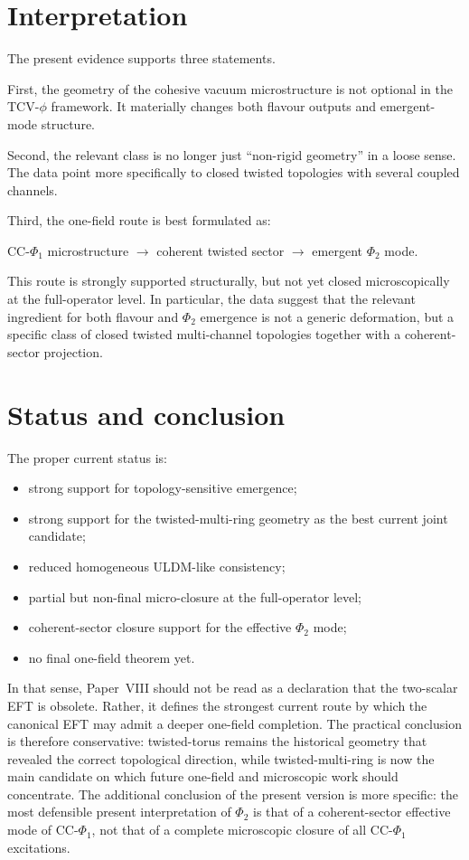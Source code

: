 \documentclass[aps,prd,onecolumn,nofootinbib,superscriptaddress]{revtex4-2}
\begin{document}
\section{Interpretation}
The present evidence supports three statements.

First, the geometry of the cohesive vacuum microstructure is not optional in the TCV-$\phi$ framework.
It materially changes both flavour outputs and emergent-mode structure.

Second, the relevant class is no longer just ``non-rigid geometry'' in a loose sense.
The data point more specifically to closed twisted topologies with several coupled channels.

Third, the one-field route is best formulated as:
\begin{center}
CC-$\Phi_1$ microstructure $\longrightarrow$ coherent twisted sector $\longrightarrow$ emergent $\Phi_2$ mode.
\end{center}
This route is strongly supported structurally, but not yet closed microscopically at the full-operator level.
In particular, the data suggest that the relevant ingredient for both flavour and $\Phi_2$ emergence is not a generic deformation, but a specific class of closed twisted multi-channel topologies together with a coherent-sector projection.

\section{Status and conclusion}
The proper current status is:
\begin{itemize}
  \item strong support for topology-sensitive emergence;
  \item strong support for the twisted-multi-ring geometry as the best current joint candidate;
  \item reduced homogeneous ULDM-like consistency;
  \item partial but non-final micro-closure at the full-operator level;
  \item coherent-sector closure support for the effective $\Phi_2$ mode;
  \item no final one-field theorem yet.
\end{itemize}

In that sense, Paper~VIII should not be read as a declaration that the two-scalar EFT is obsolete.
Rather, it defines the strongest current route by which the canonical EFT may admit a deeper one-field completion.
The practical conclusion is therefore conservative:
twisted-torus remains the historical geometry that revealed the correct topological direction, while twisted-multi-ring is now the main candidate on which future one-field and microscopic work should concentrate.
The additional conclusion of the present version is more specific:
the most defensible present interpretation of $\Phi_2$ is that of a coherent-sector effective mode of CC-$\Phi_1$, not that of a complete microscopic closure of all CC-$\Phi_1$ excitations.
\end{document}
